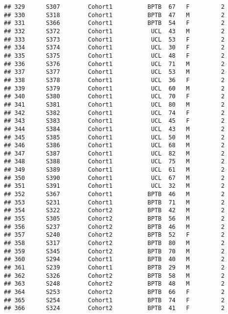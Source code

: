\documentclass[
]{article}
\begin{document}
\begin{verbatim}
## 329      S307        Cohort1          BPTB  67   F         2      
## 330      S318        Cohort1          BPTB  47   M         2      
## 331      S366        Cohort1          BPTB  54   F         2      
## 332      S372        Cohort1           UCL  43   M         2      
## 333      S373        Cohort1           UCL  53   F         2      
## 334      S374        Cohort1           UCL  30   F         2      
## 335      S375        Cohort1           UCL  48   F         2      
## 336      S376        Cohort1           UCL  71   M         2      
## 337      S377        Cohort1           UCL  53   M         2      
## 338      S378        Cohort1           UCL  36   F         2      
## 339      S379        Cohort1           UCL  60   M         2      
## 340      S380        Cohort1           UCL  70   F         2      
## 341      S381        Cohort1           UCL  80   M         2      
## 342      S382        Cohort1           UCL  74   F         2      
## 343      S383        Cohort1           UCL  45   F         2      
## 344      S384        Cohort1           UCL  43   M         2      
## 345      S385        Cohort1           UCL  50   M         2      
## 346      S386        Cohort1           UCL  68   M         2      
## 347      S387        Cohort1           UCL  82   M         2      
## 348      S388        Cohort1           UCL  75   M         2      
## 349      S389        Cohort1           UCL  61   M         2      
## 350      S390        Cohort1           UCL  67   M         2      
## 351      S391        Cohort1           UCL  32   M         2      
## 352      S367        Cohort1          BPTB  46   M         2      
## 353      S231        Cohort1          BPTB  71   M         2      
## 354      S322        Cohort2          BPTB  42   M         2      
## 355      S305        Cohort2          BPTB  56   M         2      
## 356      S237        Cohort2          BPTB  46   M         2      
## 357      S240        Cohort2          BPTB  52   F         2      
## 358      S317        Cohort2          BPTB  80   M         2      
## 359      S345        Cohort2          BPTB  70   M         2      
## 360      S294        Cohort1          BPTB  40   M         2      
## 361      S239        Cohort1          BPTB  29   M         2      
## 362      S326        Cohort2          BPTB  58   M         2      
## 363      S248        Cohort2          BPTB  48   M         2      
## 364      S253        Cohort2          BPTB  66   F         2      
## 365      S254        Cohort1          BPTB  74   F         2      
## 366      S324        Cohort2          BPTB  41   F         2      

\end{verbatim}
\end{document}
